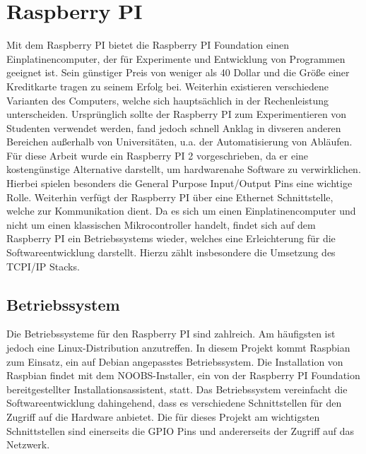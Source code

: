\chapter{Raspberry PI}\label{raspi}
Mit dem Raspberry PI bietet die Raspberry PI Foundation einen Einplatinencomputer, der für Experimente und Entwicklung von Programmen geeignet ist. Sein günstiger Preis von weniger als 40 Dollar und die Größe einer Kreditkarte tragen zu seinem Erfolg bei. Weiterhin existieren verschiedene Varianten des Computers, welche sich hauptsächlich in der Rechenleistung unterscheiden. Ursprünglich sollte der Raspberry PI zum Experimentieren von Studenten verwendet werden, fand jedoch schnell Anklag in divseren anderen Bereichen außerhalb von Universitäten, u.a. der Automatisierung von Abläufen.\\ %
Für diese Arbeit wurde ein Raspberry PI 2 vorgeschrieben, da er eine kostengünstige Alternative darstellt, um hardwarenahe Software zu verwirklichen. Hierbei spielen besonders die General Purpose Input/Output Pins eine wichtige Rolle. Weiterhin verfügt der Raspberry PI über eine Ethernet Schnittstelle, welche zur Kommunikation dient. Da es sich um einen Einplatinencomputer und nicht um einen klassischen Mikrocontroller handelt, findet sich auf dem Raspberry PI ein Betriebssystems wieder, welches eine Erleichterung für die Softwareentwicklung darstellt. Hierzu zählt insbesondere die Umsetzung des TCPI/IP Stacks.\\ %

\section{Betriebssystem}\label{os}
Die Betriebssysteme für den Raspberry PI sind zahlreich. Am häufigsten ist jedoch eine Linux-Distribution anzutreffen. In diesem Projekt kommt Raspbian zum Einsatz, ein auf Debian angepasstes Betriebssystem. Die Installation von Raspbian findet mit dem NOOBS-Installer, ein von der Raspberry PI Foundation bereitgestellter Installationsassistent, statt. %
Das Betriebssystem vereinfacht die Softwareentwicklung dahingehend, dass es verschiedene Schnittstellen für den Zugriff auf die Hardware anbietet. Die für dieses Projekt am wichtigsten Schnittstellen sind einerseits die GPIO Pins und andererseits der Zugriff auf das Netzwerk.

